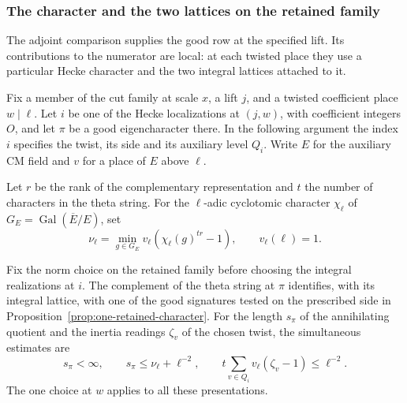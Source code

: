 \subsubsection*{The character and the two lattices on the retained family}
\label{subsec:marked-localization}

The adjoint comparison supplies the good row at the specified lift. Its contributions to the numerator are local: at each twisted place they use a particular Hecke character and the two integral lattices attached to it.

Fix a member of the cut family at scale \(x\), a lift \(j\), and
a twisted coefficient place \(w\mid\ell\). Let \(i\) be one of
the Hecke localizations at \((j,w)\), with coefficient integers
\(O\), and let \(\pi\) be a good eigencharacter there. In the
following argument the index \(i\) specifies the twist, its side
and its auxiliary level \(Q_i\). Write \(E\) for the auxiliary CM field
and \(v\) for a place of \(E\) above \(\ell\).

Let \(r\) be the rank of the complementary representation and \(t\) the
number of characters in the theta string. For the \(\ell\)-adic cyclotomic
character \(\chi_\ell\) of \(G_E=\operatorname{Gal}(\overline E/E)\), set
\begin{equation}\label{eq:signature-cyclotomic-minimum}
 \nu_\ell=\min_{g\in G_E}v_\ell\!\left(\chi_\ell(g)^{tr}-1\right),
 \qquad v_\ell(\ell)=1.
\end{equation}

\begin{proposition}
\label{prop:marked-signature}
Fix the norm choice on the retained family before choosing the
integral realizations at \(i\). The complement of the theta string
at \(\pi\) identifies, with its integral lattice, with one of the
good signatures tested on the prescribed side in
Proposition~\ref{prop:one-retained-character}. For the length \(s_\pi\) of
the annihilating quotient and the inertia readings \(\zeta_v\)
of the chosen twist, the simultaneous estimates are
\[
 s_\pi<\infty,\qquad s_\pi\le\nu_\ell+\ell^{-2},\qquad
 t\sum_{v\in Q_i} v_\ell(\zeta_v-1)\le\ell^{-2}.
\]
The one choice at \(w\) applies to all these presentations.
\end{proposition}

